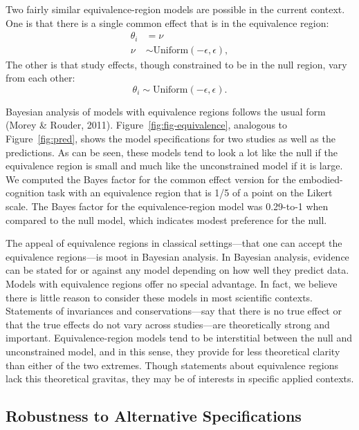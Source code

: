 \documentclass[english,man]{apa6}
\theoremstyle{definition}
\theoremstyle{definition}
\theoremstyle{remark}
\begin{document}
Two fairly similar equivalence-region models are possible in the current
context. One is that there is a single common effect that is in the
equivalence region:\\
\[
\begin{aligned}
\theta_i &= \nu\\
\nu &\sim \mbox{Uniform}(-\epsilon,\epsilon),
\end{aligned}
\] The other is that study effects, though constrained to be in the null
region, vary from each other: \[
\theta_i \sim \mbox{Uniform}(-\epsilon,\epsilon).
\]

Bayesian analysis of models with equivalence regions follows the usual
form (Morey \& Rouder, 2011). Figure~\ref{fig:fig-equivalence},
analogous to Figure~\ref{fig:pred}, shows the model specifications for
two studies as well as the predictions. As can be seen, these models
tend to look a lot like the null if the equivalence region is small and
much like the unconstrained model if it is large. We computed the Bayes
factor for the common effect version for the embodied-cognition task
with an equivalence region that is 1/5 of a point on the Likert scale.
The Bayes factor for the equivalence-region model was 0.29-to-1 when
compared to the null model, which indicates modest preference for the
null.

The appeal of equivalence regions in classical settings---that one can
accept the equivalence regions---is moot in Bayesian analysis. In
Bayesian analysis, evidence can be stated for or against any model
depending on how well they predict data. Models with equivalence regions
offer no special advantage. In fact, we believe there is little reason
to consider these models in most scientific contexts. Statements of
invariances and conservations---say that there is no true effect or that
the true effects do not vary across studies---are theoretically strong
and important. Equivalence-region models tend to be interstitial between
the null and unconstrained model, and in this sense, they provide for
less theoretical clarity than either of the two extremes. Though
statements about equivalence regions lack this theoretical gravitas,
they may be of interests in specific applied contexts.

\subsection{Robustness to Alternative
Specifications}\label{robustness-to-alternative-specifications}
\end{document}
